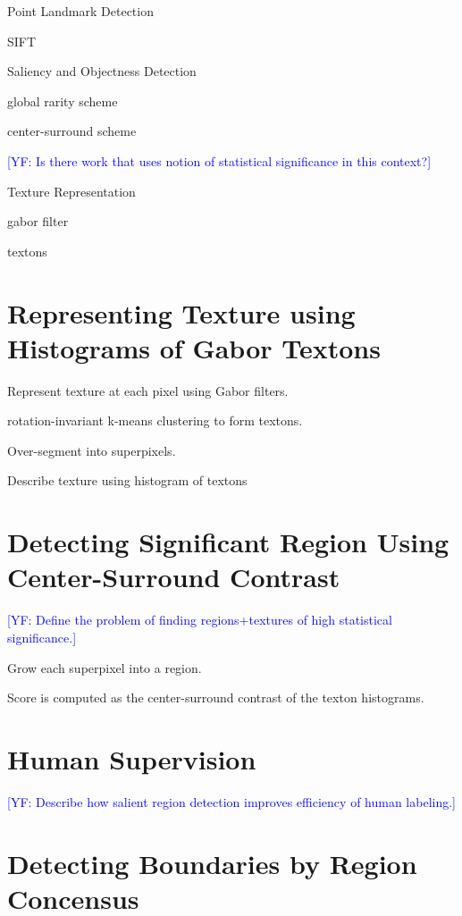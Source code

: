 \documentclass{llncs}
\newcommand{\authcmt}[2]{\textcolor{#1}{#2}}
\newcommand{\yoav}[1]{\authcmt{blue}{[YF: #1]}}
\begin{document}
\begin{description}

\item{Point Landmark Detection}

SIFT

\item{Saliency and Objectness Detection}

global rarity scheme

center-surround scheme

\yoav{Is there work that uses notion of statistical significance in
  this context?}

\item{Texture Representation}

gabor filter

textons

\end{description}

\section{Representing Texture using Histograms of Gabor Textons}

Represent texture at each pixel using Gabor filters.

rotation-invariant k-means clustering to form textons.

Over-segment into superpixels.

Describe texture using histogram of textons

\section{Detecting Significant Region Using Center-Surround Contrast}

\yoav{Define the problem of finding regions+textures of high
  statistical significance.}

Grow each superpixel into a region.

Score is computed as the center-surround contrast of the texton histograms.

\section{Human Supervision}

\yoav{Describe how salient region detection improves efficiency of human labeling.}

\section{Detecting Boundaries by Region Concensus}
\end{document}
